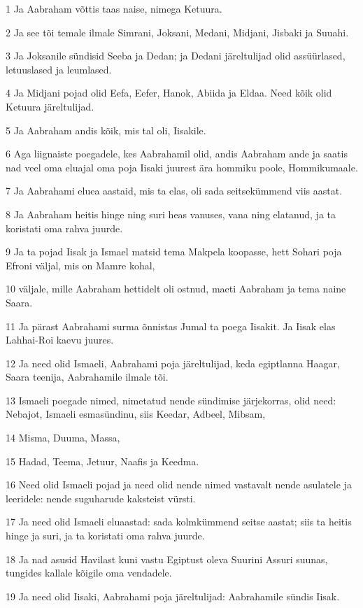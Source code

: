 \par 1 Ja Aabraham võttis taas naise, nimega Ketuura.
\par 2 Ja see tõi temale ilmale Simrani, Joksani, Medani, Midjani, Jisbaki ja Suuahi.
\par 3 Ja Joksanile sündisid Seeba ja Dedan; ja Dedani järeltulijad olid assüürlased, letuuslased ja leumlased.
\par 4 Ja Midjani pojad olid Eefa, Eefer, Hanok, Abiida ja Eldaa. Need kõik olid Ketuura järeltulijad.
\par 5 Ja Aabraham andis kõik, mis tal oli, Iisakile.
\par 6 Aga liignaiste poegadele, kes Aabrahamil olid, andis Aabraham ande ja saatis nad veel oma eluajal oma poja Iisaki juurest ära hommiku poole, Hommikumaale.
\par 7 Ja Aabrahami eluea aastaid, mis ta elas, oli sada seitsekümmend viis aastat.
\par 8 Ja Aabraham heitis hinge ning suri heas vanuses, vana ning elatanud, ja ta koristati oma rahva juurde.
\par 9 Ja ta pojad Iisak ja Ismael matsid tema Makpela koopasse, hett Sohari poja Efroni väljal, mis on Mamre kohal,
\par 10 väljale, mille Aabraham hettidelt oli ostnud, maeti Aabraham ja tema naine Saara.
\par 11 Ja pärast Aabrahami surma õnnistas Jumal ta poega Iisakit. Ja Iisak elas Lahhai-Roi kaevu juures.
\par 12 Ja need olid Ismaeli, Aabrahami poja järeltulijad, keda egiptlanna Haagar, Saara teenija, Aabrahamile ilmale tõi.
\par 13 Ismaeli poegade nimed, nimetatud nende sündimise järjekorras, olid need: Nebajot, Ismaeli esmasündinu, siis Keedar, Adbeel, Mibsam,
\par 14 Misma, Duuma, Massa,
\par 15 Hadad, Teema, Jetuur, Naafis ja Keedma.
\par 16 Need olid Ismaeli pojad ja need olid nende nimed vastavalt nende asulatele ja leeridele: nende suguharude kaksteist vürsti.
\par 17 Ja need olid Ismaeli eluaastad: sada kolmkümmend seitse aastat; siis ta heitis hinge ja suri, ja ta koristati oma rahva juurde.
\par 18 Ja nad asusid Havilast kuni vastu Egiptust oleva Suurini Assuri suunas, tungides kallale kõigile oma vendadele.
\par 19 Ja need olid Iisaki, Aabrahami poja järeltulijad: Aabrahamile sündis Iisak.
